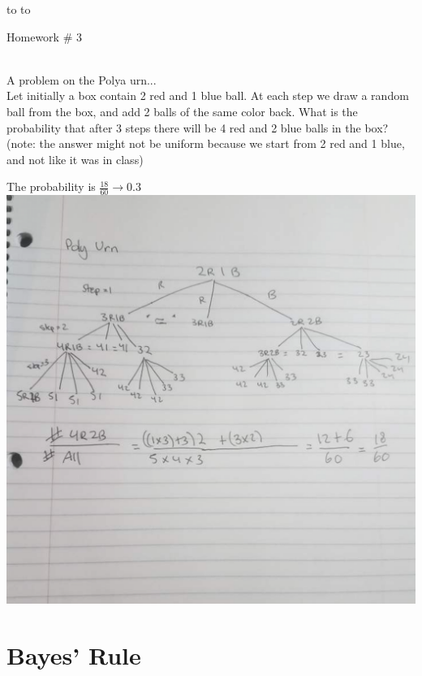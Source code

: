 \documentclass[10pt]{report}
\newcommand{\handout}{
   \renewcommand{\thepage}{}
   \noindent
   \begin{center}
      \vbox{
    \hbox to \columnwidth {\sc{\course} --- \prof \hfill}
    \vspace{-2mm}
    \hbox to \columnwidth {\sc due \MakeLowercase{\duedate} \duelocation \hfill {\LARGE\color{mdb}\yourid}}
      }
   \end{center}
      Homework \# 3
   \vspace*{2mm}
}
\begin{document}
\thispagestyle{empty}
\handout

\setcounter{chapter}{1} 
\ \\
{\color{cit}A problem on the Polya urn...} \\

Let initially a box contain 2 red and 1 blue ball. At each step we draw a random ball from the box, and add 2 balls of the same color back. What is the probability that after 3 steps there will be 4 red and 2 blue balls in the box? (note: the answer might not be uniform because we start from 2 red and 1 blue, and not like it was in class)
\begin{center}
The probability is $\frac{18}{60} \rightarrow \mathbf{0.3} $ \\
\includegraphics[scale=0.5]{polyurn.png}
\end{center}

\setcounter{section}{4}
\section{\sc\color{cit}Bayes' Rule}
\setcounter{subsection}{2}
\end{document}
